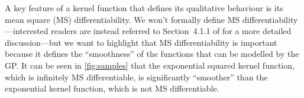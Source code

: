 \documentclass[letterpaper]{ar-1col}
\begin{document}
A key feature of a kernel function that defines its qualitative behaviour is its mean square (MS) differentiability.
We won't formally define MS differentiability---interested readers are instead referred to Section~4.1.1 of \citet{gpml} for a more detailed discussion---but we want to highlight that MS differentiability is important because it defines the ``smoothness'' of the functions that can be modelled by the GP.
It can be seen in \autoref{fig:samples} that the exponential squared kernel function, which is infinitely MS differentiable, is significantly ``smoother'' than the exponential kernel function, which is not MS differentiable.

\begin{armarginnote}[]
\end{armarginnote}
\end{document}
